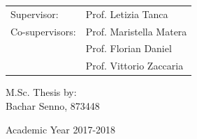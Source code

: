 {\begin{center}
\vspace{1.5cm}

\end{center}


\vspace{2.0cm} 
\large
\begin{flushleft}
\begin{tabular}{@{}ll}
Supervisor: & Prof. Letizia Tanca\\
Co-supervisors: & Prof. Maristella Matera \\ & Prof. Florian Daniel \\ & Prof. Vittorio Zaccaria
\end{tabular}
\end{flushleft}

\vspace{1.5cm}

\begin{flushright}
M.Sc. Thesis by: \\ 
{Bachar Senno}, 873448 \\
\end{flushright}

\vspace{1.5cm}

\begin{center}
Academic Year 2017-2018
\end{center} 

\clearpage
}
